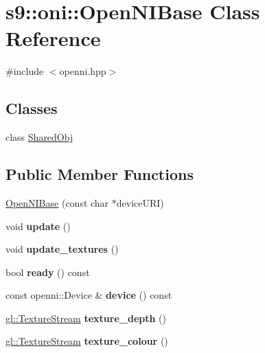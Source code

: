\hypertarget{classs9_1_1oni_1_1OpenNIBase}{\section{s9\-:\-:oni\-:\-:\-Open\-N\-I\-Base \-Class \-Reference}
\label{classs9_1_1oni_1_1OpenNIBase}
}


{\ttfamily \#include $<$openni.\-hpp$>$}

\subsection*{\-Classes}
\begin{DoxyCompactItemize}
\item 
class \hyperlink{classs9_1_1oni_1_1OpenNIBase_1_1SharedObj}{\-Shared\-Obj}
\end{DoxyCompactItemize}
\subsection*{\-Public \-Member \-Functions}
\begin{DoxyCompactItemize}
\item 
\hyperlink{classs9_1_1oni_1_1OpenNIBase_a466d4d6f769490e0703490004d7e9dcc}{\-Open\-N\-I\-Base} (const char $\ast$device\-U\-R\-I)
\item 
\hypertarget{classs9_1_1oni_1_1OpenNIBase_a5b4ca88fa0300b69767f2f467c8eba6b}{void {\bfseries update} ()}\label{classs9_1_1oni_1_1OpenNIBase_a5b4ca88fa0300b69767f2f467c8eba6b}

\item 
\hypertarget{classs9_1_1oni_1_1OpenNIBase_a085e86dde9db808bad3c50f4e01beaaa}{void {\bfseries update\-\_\-textures} ()}\label{classs9_1_1oni_1_1OpenNIBase_a085e86dde9db808bad3c50f4e01beaaa}

\item 
\hypertarget{classs9_1_1oni_1_1OpenNIBase_a61e7dc25e52512b03f3bee5982313ecf}{bool {\bfseries ready} () const }\label{classs9_1_1oni_1_1OpenNIBase_a61e7dc25e52512b03f3bee5982313ecf}

\item 
\hypertarget{classs9_1_1oni_1_1OpenNIBase_ad6e2e4869b43c422a282dfe353b08cba}{const openni\-::\-Device \& {\bfseries device} () const }\label{classs9_1_1oni_1_1OpenNIBase_ad6e2e4869b43c422a282dfe353b08cba}

\item 
\hypertarget{classs9_1_1oni_1_1OpenNIBase_a1b611add3bff1206156c944c2d4f26fa}{\hyperlink{classs9_1_1gl_1_1TextureStream}{gl\-::\-Texture\-Stream} {\bfseries texture\-\_\-depth} ()}\label{classs9_1_1oni_1_1OpenNIBase_a1b611add3bff1206156c944c2d4f26fa}

\item 
\hypertarget{classs9_1_1oni_1_1OpenNIBase_a050f094eb69f9097e341b2f78ac8c995}{\hyperlink{classs9_1_1gl_1_1TextureStream}{gl\-::\-Texture\-Stream} {\bfseries texture\-\_\-colour} ()}\label{classs9_1_1oni_1_1OpenNIBase_a050f094eb69f9097e341b2f78ac8c995}

\end{DoxyCompactItemize}
